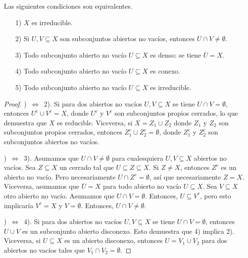 \documentclass{article}
\numberwithin{equation}{section}
\theoremstyle{definition}
\begin{document}
\begin{proposicion}
  Las siguientes condiciones son equivalentes.

  \begin{enumerate}
  \item[1)] $X$ es irreducible.

  \item[2)] Si $U,V\subseteq X$ son subconjuntos abiertos no vacíos, entonces
    $U\cap V \ne \emptyset$.

  \item[3)] Todo subconjunto abierto no vacío $U \subseteq X$ es denso: se tiene
    $\overline{U} = X$.

  \item[4)] Todo subconjunto abierto no vacío $U \subseteq X$ es conexo.

  \item[5)] Todo subconjunto abierto no vacío $U \subseteq X$ es irreducible.
  \end{enumerate}

  \begin{proof}
    )~$\Leftrightarrow$~2). Si para dos abiertos no vacíos
    $U,V \subseteq X$ se tiene $U\cap V = \emptyset$, entonces
    $U^c \cup V^c = X$, donde $U^c$ y $V^c$ son subconjuntos propios cerrados,
    lo que demuestra que $X$ es reducible. Viceversa, si $X = Z_1 \cup Z_2$
    donde $Z_1$ y $Z_2$ son subconjuntos propios cerrados, entonces
    $Z_1^c \cup Z_2^c = \emptyset$, donde $Z_1^c$ y $Z_2^c$ son subconjuntos
    abiertos no vacíos.

    )~$\Leftrightarrow$~3). Asumamos que $U\cap V \ne \emptyset$ para
    cualesquiera $U,V\subseteq X$ abiertos no vacíos. Sea $Z \subseteq X$
    un cerrado tal que $U \subseteq Z \subseteq X$. Si $Z \ne X$, entonces $Z^c$
    es un abierto no vacío. Pero necesariamente $U \cap Z^c = \emptyset$,
    así que necesariamente $Z = X$. Viceversa, asumamos que $\overline{U} = X$
    para todo abierto no vacío $U \subseteq X$. Sea $V \subseteq X$ otro abierto
    no vacío. Asumamos que $U\cap V = \emptyset$. Entonces, $U \subseteq V^c$,
    pero esto implicaría $V^c = X$ y $V = \emptyset$. Entonces,
    $U\cap V \ne \emptyset$.

    )~$\Leftrightarrow$~4). Si para dos abiertos no vacíos
    $U,V \subseteq X$ se tiene $U\cap V = \emptyset$, entonces $U\cup V$ es
    un subconjunto abierto disconexo. Esto demuestra que 4) implica
    2). Viceversa, si $U \subseteq X$ es un abierto disconexo, entonces
    $U = V_1 \cup V_2$ para dos abiertos no vacíos tales que
    $V_1\cap V_2 = \emptyset$.


\end{proof}
\end{proposicion}
\end{document}
